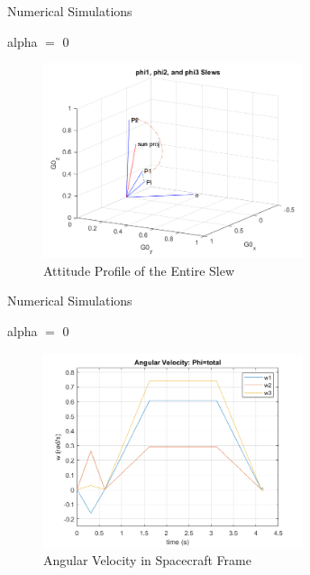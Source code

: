 \documentclass{beamer}
\begin{document}
\begin{frame}{Numerical Simulations}
	\begin{block}{alpha $=$ 0}
		
		\begin{figure}[H]
			\label{fig:phi1_phi2_phi3_alpha0}
			\includegraphics[width=3in]{figures/alpha0/phi1_phi2_phi3.png}
			\caption{Attitude Profile of the Entire Slew}
		\end{figure}
		
	\end{block}
\end{frame}
\begin{frame}{Numerical Simulations}
	\begin{block}{alpha $=$ 0}
		
		
		\begin{figure}[H]
			\label{fig:ang_vel_phi_total_alpha0}
			\begin{center}
				\includegraphics[width=3in]{figures/alpha0/ang_vel.png}
			\end{center}
			\caption{Angular Velocity in Spacecraft Frame}
		\end{figure}
		
	\end{block}
\end{frame}
\end{document}
